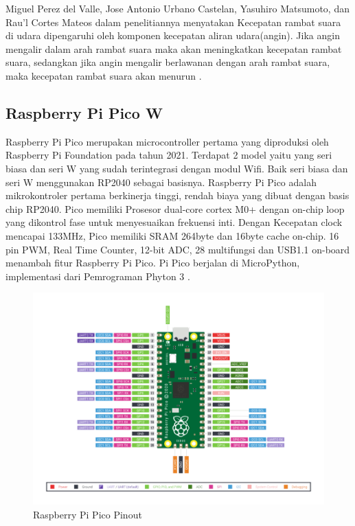 Miguel Perez del Valle, Jose Antonio Urbano Castelan, Yasuhiro Matsumoto, dan Rau’l Cortes Mateos dalam penelitiannya menyatakan 
Kecepatan rambat suara di udara dipengaruhi oleh komponen kecepatan aliran udara(angin). Jika angin mengalir dalam arah rambat 
suara maka akan meningkatkan kecepatan rambat suara, sedangkan jika angin mengalir berlawanan dengan arah rambat suara, maka 
kecepatan rambat suara akan menurun \parencite{del2007low}.

\subsection{Raspberry Pi Pico W}

Raspberry Pi Pico merupakan microcontroller pertama yang diproduksi oleh Raspberry Pi Foundation pada tahun 2021. Terdapat 2 model
yaitu yang seri biasa dan seri W yang sudah terintegrasi dengan modul Wifi. Baik seri biasa dan seri W menggunakan RP2040 sebagai basisnya.
Raspberry Pi Pico adalah mikrokontroler pertama berkinerja tinggi, rendah biaya
yang dibuat dengan basis chip RP2040. Pico memiliki
Prosesor dual-core cortex M0+ dengan on-chip
loop yang dikontrol fase untuk menyesuaikan frekuensi inti. Dengan
Kecepatan clock mencapai 133MHz, Pico memiliki SRAM 264byte dan 16byte
cache on-chip. 16 pin PWM, Real Time Counter,
12-bit ADC, 28 multifungsi
dan USB1.1 on-board menambah fitur Raspberry Pi
Pico. Pi Pico berjalan di MicroPython, implementasi dari
Pemrograman Phyton 3 \parencite{thothadri2021analysis}.

\begin{figure}
	\centering
	\includegraphics[width=0.7\linewidth]{"gambar/pico pinout"}
	\caption{Raspberry Pi Pico Pinout \parencite{figPicoPinout}}
	\label{fig:pico-pinout}
\end{figure}
